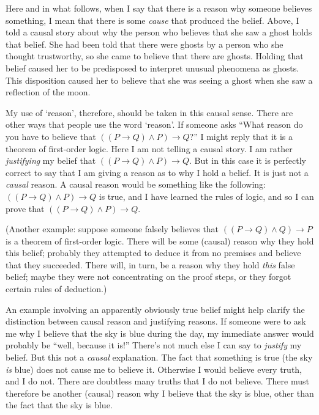 \documentclass[11pt]{article}
\begin{document}
\begin{spacing}{1.5}
Here and in what follows, when I say that there is a reason why
someone believes something, I mean that there is some {\em cause} that
produced the belief.  Above, I told a causal story about why the
person who believes that she saw a ghost holds that belief.  She had
been told that there were ghosts by a person who she thought
trustworthy, so she came to believe that there are ghosts.  Holding
that belief caused her to be predisposed to interpret unusual
phenomena as ghosts.  This disposition caused her to believe that she
was seeing a ghost when she saw a reflection of the moon.

My use of `reason', therefore, should be taken in this causal sense.
There are other ways that people use the word `reason'.  If someone
asks ``What reason do you have to believe that $((P \rightarrow Q )
\wedge P) \rightarrow Q$?''  I might reply that it is a theorem of
first-order logic.  Here I am not telling a causal story.  I am rather
{\em justifying} my belief that $((P \rightarrow Q ) \wedge P)
\rightarrow Q$.  But in this case it is perfectly correct to say that
I am giving a reason as to why I hold a belief.  It is just not a {\em
  causal} reason.  A causal reason would be something like the
following: $((P \rightarrow Q ) \wedge P) \rightarrow Q$ is true, and
I have learned the rules of logic, and so I can prove that $((P
\rightarrow Q ) \wedge P) \rightarrow Q$.

(Another example: suppose someone falsely believes that $((P
\rightarrow Q ) \wedge Q) \rightarrow P$ is a theorem of first-order
logic.  There will be some (causal) reason why they hold this belief;
probably they attempted to deduce it from no premises and believe that
they succeeded.  There will, in turn, be a reason why they hold {\em
  this} false belief; maybe they were not concentrating on the proof
steps, or they forgot certain rules of deduction.)

An example involving an apparently obviously true belief might help
clarify the distinction between causal reason and justifying reasons.
If someone were to ask me why I believe that the sky is blue during
the day, my immediate answer would probably be ``well, because it
is!''  There's not much else I can say to {\em justify} my belief.
But this not a {\em causal} explanation.  The fact that something is
true (the sky {\em is} blue) does not cause me to believe it.
Otherwise I would believe every truth, and I do not.  There are
doubtless many truths that I do not believe.  There must therefore be
another (causal) reason why I believe that the sky is blue, other than
the fact that the sky is blue.


\end{spacing}
\end{document}
